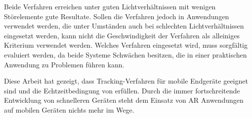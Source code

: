 Beide Verfahren erreichen unter guten Lichtverhältnissen mit wenigen Störelemente gute Resultate. Sollen die Verfahren
 jedoch in Anwendungen verwendet werden, die unter Umständen auch bei schlechten Lichtverhältnissen eingesetzt werden,
 kann nicht die Geschwindigkeit der Verfahren als alleiniges Kriterium verwendet werden. Welches Verfahren eingesetzt
 wird, muss sorgfältig evaluiert werden, da beide Systeme Schwächen besitzen, die in einer praktischen Anwendung zu
 Problemen führen kann.

Diese Arbeit hat gezeigt, dass Tracking-Verfahren für mobile Endgeräte geeignet sind und die Echtzeitbedingung von \citeauthor{azuma97} erfüllen. Durch die immer fortschreitende Entwicklung von schnelleren Geräten steht dem Einsatz von \gls{AR} Anwendungen auf mobilen Geräten nichts mehr im Wege.

